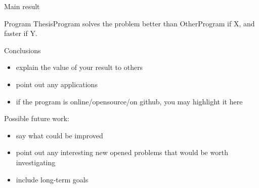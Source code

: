 \documentclass[portrait,a0paper,fontscale=0.25]{baposter}
\begin{document}
\begin{poster}
\begin{posterbox}[column=1, name=result3, below=result2, headerColorOne=green!50!yellow, boxColorOne=green!10]{Main result}
\large\bfseries
\vspace{1ex}
\begin{center}
Program ThesisProgram solves the problem better than OtherProgram if X, and faster if Y.
\end{center}
\vspace{.5ex}
\end{posterbox}

\begin{posterbox}[column=1, name=conclusion, below=result3, bottomaligned=something2]{Conclusions}
\begin{itemize}
\item explain the value of your result to others
\item point out any applications
\item if the program is online/opensource/on github, you may highlight it here
\end{itemize}
Possible future work:
\begin{itemize}
\item say what could be improved
\item point out any interesting new opened problems that would be worth investigating
\item include long-term goals
\end{itemize}
\end{posterbox}

\end{poster}
\end{document}

